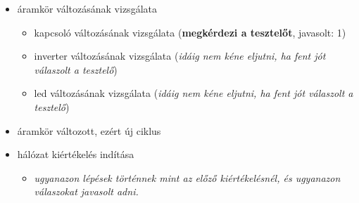 {\begin{itemize}
\begin{itemize}
\begin{itemize}
\setlength{\itemsep}{0cm}%
\setlength{\parskip}{0cm}%
\setlength{\itemindent}{-25pt}%
	\item kapcsoló kiértékelése
	\begin{itemize}
	\setlength{\itemsep}{0cm}%
	\setlength{\parskip}{0cm}%
	\setlength{\itemindent}{-35pt}%
		\item kapcsoló állapotának lekérdezése (\textbf{megkérdezi a tesztelőt}, javasolt: 1)
		\item kapcsoló értékének kiadása a vezetékre
	\end{itemize}
	\item inverter kiértékelése
	\begin{itemize}
	\setlength{\itemsep}{0cm}%
	\setlength{\parskip}{0cm}%
	\setlength{\itemindent}{-35pt}%
		\item bemenet lekérdezése (\textbf{megkérdezi a tesztelőt}, javasolt: 1)
		\item kimenet kiadása a vezetékre (\textbf{megkérdezi a tesztelőt}, javasolt: 0)
	\end{itemize}\item led kiértékelése
	\begin{itemize}
	\setlength{\itemsep}{0cm}%
	\setlength{\parskip}{0cm}%
	\setlength{\itemindent}{-35pt}%
		\item led bemenetének lekérdezése (\textbf{megkérdezi a tesztelőt}, javasolt: 0)
	\end{itemize}
\end{itemize}
\item áramkör változásának vizsgálata
\begin{itemize}
\setlength{\itemsep}{0cm}%
\setlength{\parskip}{0cm}%
\setlength{\itemindent}{-25pt}%
	\item kapcsoló változásának vizsgálata (\textbf{megkérdezi a tesztelőt}, javasolt: 1)
	\item inverter változásának vizsgálata (\textit{idáig nem kéne eljutni, ha fent jót válaszolt a tesztelő})
	\item led változásának vizsgálata (\textit{idáig nem kéne eljutni, ha fent jót válaszolt a tesztelő})
\end{itemize}
\item áramkör változott, ezért új ciklus
\item hálózat kiértékelés indítása
\begin{itemize}
\setlength{\itemsep}{0cm}%
\setlength{\parskip}{0cm}%
\setlength{\itemindent}{-25pt}%
	\item \textit{ugyanazon lépések történnek mint az előző kiértékelésnél, és ugyanazon válaszokat javasolt adni.}

\end{itemize}
\end{itemize}
\end{itemize}}
